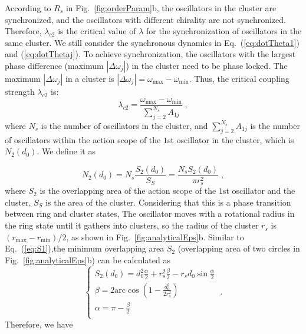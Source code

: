 \documentclass[%
 aip,
 amsmath,amssymb,
 reprint,%
]{revtex4-1}
\begin{document}
According to $R_s$ in Fig.~\ref{fig:orderParam}b, the oscillators in the cluster are synchronized, and the oscillators with different chirality are not synchronized. Therefore, $\lambda_{c2}$ is the critical value of $\lambda$ for the synchronization of oscillators in the same cluster. We still consider the synchronous dynamics in Eq.~(\ref{eq:dotTheta1}) and (\ref{eq:dotThetaj}). To achieve synchronization, the oscillators with the largest phase difference (maximum $\left| \Delta \omega _j \right|$) in the cluster need to be phase locked. The maximum $\left| \Delta \omega _j \right|$ in a cluster is $\left| \Delta \omega _j \right|=\omega _{\max}-\omega _{\min}$. Thus, the critical coupling strength $\lambda_{c2}$ is:
\begin{equation}
    \lambda _{c2}=\frac{\omega _{\max}-\omega _{\min}}{\sum\nolimits_{j=2}^{N_s}{A_{1j}}}\;,
\end{equation}
where $N_s$ is the number of oscillators in the cluster, and $\sum\nolimits_{j=2}^{N_s}{A_{1j}}$ is the number of oscillators within the action scope of the $1$st oscillator in the cluster, which is $N_2\left( d_0 \right)$. We define it as

\begin{equation}
    N_2\left( d_0 \right) =N_s\frac{S_2\left( d_0 \right)}{S_S}=\frac{N_sS_2\left( d_0 \right)}{\pi r_{s}^{2}}\;,
\end{equation}
where $S_2$ is the overlapping area of the action scope of the $1$st oscillator and the cluster, $S_S$ is the area of the cluster. Considering that this is a phase transition between ring and cluster states, The oscillator moves with a rotational radius in the ring state until it gathers into clusters, so the radius of the cluster $r_s$ is $(r_{\max}-r_{\min})/2$, as shown in Fig.~\ref{fig:analyticalEps}b. Similar to Eq.~(\ref{eq:S1}),the minimum overlapping area $S_2$ (overlapping area of two circles in Fig.~\ref{fig:analyticalEps}b) can be calculated as
\begin{equation}
    \begin{cases}
        S_2\left( d_0 \right) =d_{0}^{2}\frac{\alpha}{2}+r_{s}^{2}\frac{\beta}{2}-r_sd_0\sin \frac{\alpha}{2}\\
        \beta =2\mathrm{arc}\cos \left( 1-\frac{d_{0}^{2}}{2r_{s}^{2}} \right)\\
        \alpha =\pi -\frac{\beta}{2}\\
    \end{cases}\;.
\end{equation}
Therefore, we have
\end{document}
